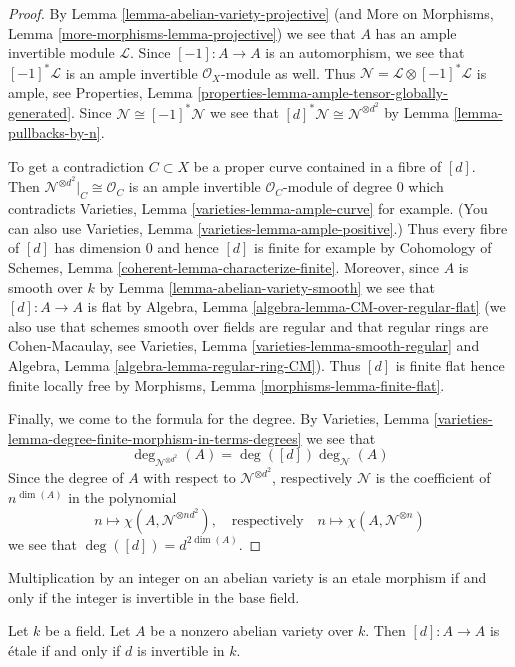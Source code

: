 \begin{proof}
By Lemma \ref{lemma-abelian-variety-projective}
(and More on Morphisms, Lemma \ref{more-morphisms-lemma-projective})
we see that $A$ has an ample invertible module $\mathcal{L}$.
Since $[-1] : A \to A$ is an automorphism, we see that
$[-1]^*\mathcal{L}$ is an ample invertible $\mathcal{O}_X$-module
as well. Thus $\mathcal{N} = \mathcal{L} \otimes [-1]^*\mathcal{L}$
is ample, see
Properties, Lemma \ref{properties-lemma-ample-tensor-globally-generated}.
Since $\mathcal{N} \cong [-1]^*\mathcal{N}$ we see that
$[d]^*\mathcal{N} \cong \mathcal{N}^{\otimes d^2}$ by
Lemma \ref{lemma-pullbacks-by-n}.

\medskip\noindent
To get a contradiction $C \subset X$ be a proper curve contained in a
fibre of $[d]$. Then $\mathcal{N}^{\otimes d^2}|_C \cong \mathcal{O}_C$
is an ample invertible $\mathcal{O}_C$-module of degree $0$ which
contradicts Varieties, Lemma \ref{varieties-lemma-ample-curve} for example.
(You can also use Varieties, Lemma \ref{varieties-lemma-ample-positive}.)
Thus every fibre of $[d]$ has dimension $0$ and hence $[d]$ is finite
for example by Cohomology of Schemes, Lemma
\ref{coherent-lemma-characterize-finite}.
Moreover, since $A$ is smooth over $k$ by
Lemma \ref{lemma-abelian-variety-smooth}
we see that $[d] : A \to A$ is flat by
Algebra, Lemma \ref{algebra-lemma-CM-over-regular-flat}
(we also use that schemes smooth over fields are regular and that
regular rings are Cohen-Macaulay, see
Varieties, Lemma \ref{varieties-lemma-smooth-regular} and
Algebra, Lemma \ref{algebra-lemma-regular-ring-CM}).
Thus $[d]$ is finite flat hence finite locally free by
Morphisms, Lemma \ref{morphisms-lemma-finite-flat}.

\medskip\noindent
Finally, we come to the formula for the degree. By
Varieties, Lemma \ref{varieties-lemma-degree-finite-morphism-in-terms-degrees}
we see that
$$
\deg_{\mathcal{N}^{\otimes d^2}}(A) = \deg([d]) \deg_\mathcal{N}(A)
$$
Since the degree of $A$ with respect to
$\mathcal{N}^{\otimes d^2}$, respectively $\mathcal{N}$
is the coefficient of $n^{\dim(A)}$ in the polynomial
$$
n \longmapsto \chi(A, \mathcal{N}^{\otimes nd^2}),\quad
\text{respectively}\quad n \longmapsto \chi(A, \mathcal{N}^{\otimes n})
$$
we see that $\deg([d]) = d^{2 \dim(A)}$.
\end{proof}

\begin{lemma}
\label{lemma-abelian-variety-multiplication-by-d-etale}
\begin{slogan}
Multiplication by an integer on an abelian variety is an etale morphism
if and only if the integer is invertible in the base field.
\end{slogan}
Let $k$ be a field. Let $A$ be a nonzero abelian variety over $k$.
Then $[d] : A \to A$ is \'etale if and only if $d$ is invertible in $k$.
\end{lemma}

